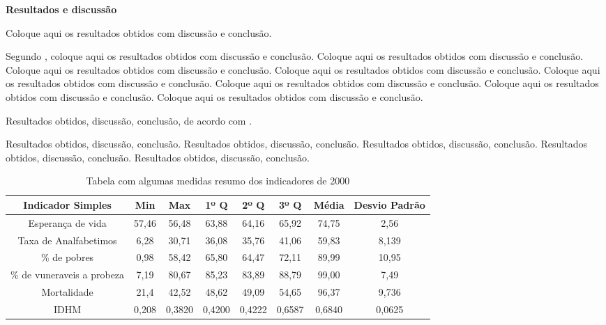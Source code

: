 \documentclass[11pt,a4paper]{article}
\begin{document}
\textbf{Resultados e discussão}

Coloque aqui os resultados obtidos com discussão e conclusão. 

Segundo \cite{SHW}, coloque aqui os resultados obtidos com discussão e conclusão. Coloque aqui os resultados obtidos com discussão e conclusão. Coloque aqui os resultados obtidos com discussão e conclusão. Coloque aqui os resultados obtidos com discussão e conclusão. Coloque aqui os resultados obtidos com discussão e conclusão. Coloque aqui os resultados obtidos com discussão e conclusão. Coloque aqui os resultados obtidos com discussão e conclusão. Coloque aqui os resultados obtidos com discussão e conclusão.

Resultados obtidos, discussão, conclusão, de acordo com \cite{damn}.

Resultados obtidos, discussão, conclusão. Resultados obtidos, discussão, conclusão. Resultados obtidos, discussão, conclusão. Resultados obtidos, discussão, conclusão. Resultados obtidos, discussão, conclusão. 

\begin{table}[h!]
  \begin{center}
    \begin{tabular}{c|c|c|c|c|c|c|c}
    \hline
      \textbf{Indicador Simples} & \textbf{Min} & \textbf{Max} & \textbf{1º Q} & \textbf{2º Q} & \textbf{3º Q} & \textbf{Média}  & \textbf{Desvio Padrão} \\
      \hline
      Esperança de vida & 57,46 & 56,48 & 63,88 & 64,16 & 65,92 & 74,75 & 2,56\\
      Taxa de Analfabetimos & 6,28 & 30,71 & 36,08 & 35,76 & 41,06 & 59,83 & 8,139\\
      \% de pobres & 0,98 & 58,42 & 65,80 & 64,47 & 72,11 & 89,99 & 10,95\\ 
      \% de vuneraveis a probeza & 7,19 & 80,67 & 85,23 & 83,89 & 88,79 & 99,00 & 7,49 \\ 
      Mortalidade & 21,4 & 42,52 & 48,62 & 49,09 & 54,65 & 96,37 &  9,736\\ 
      IDHM & 0,208 & 0,3820 & 0,4200 & 0,4222 & 0,6587 & 0,6840 & 0,0625 \\
      \hline
    \end{tabular}
    \caption{Tabela com algumas medidas resumo dos indicadores de 2000}
     \label{table:1}
  \end{center}
\end{table}
\end{document}
